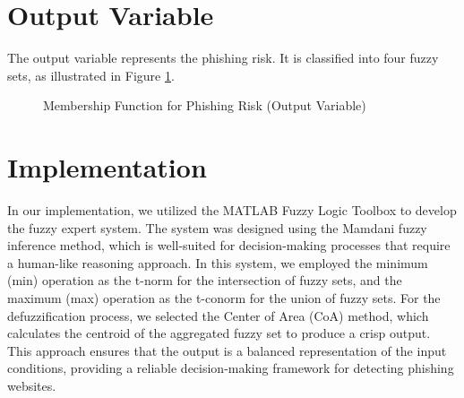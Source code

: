 \documentclass[11pt]{article}
\begin{document}
\section{Output Variable}
The output variable represents the phishing risk. It is classified into four fuzzy sets, as illustrated in Figure \ref{output_variable}.

\begin{figure}[H]
    \centering
    \caption{Membership Function for Phishing Risk (Output Variable)}
    \label{output_variable}
\end{figure}

\section{Implementation}
In our implementation, we utilized the MATLAB Fuzzy Logic Toolbox to develop the fuzzy expert system. The system was designed using the Mamdani fuzzy inference method, which is well-suited for decision-making processes that require a human-like reasoning approach. In this system, we employed the minimum (min) operation as the t-norm for the intersection of fuzzy sets, and the maximum (max) operation as the t-conorm for the union of fuzzy sets. For the defuzzification process, we selected the Center of Area (CoA) method, which calculates the centroid of the aggregated fuzzy set to produce a crisp output. This approach ensures that the output is a balanced representation of the input conditions, providing a reliable decision-making framework for detecting phishing websites.
\end{document}
